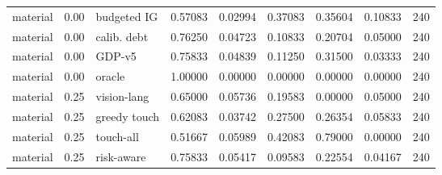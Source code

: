 \documentclass{article}
\begin{document}
\begin{center}
\begin{longtable}{lllllllll}
material & 0.00 & budgeted IG & 0.57083 & 0.02994 & 0.37083 & 0.35604 & 0.10833 & 240 \\
material & 0.00 & calib. debt & 0.76250 & 0.04723 & 0.10833 & 0.20704 & 0.05000 & 240 \\
material & 0.00 & GDP-v5 & 0.75833 & 0.04839 & 0.11250 & 0.31500 & 0.03333 & 240 \\
material & 0.00 & oracle & 1.00000 & 0.00000 & 0.00000 & 0.00000 & 0.00000 & 240 \\
material & 0.25 & vision-lang & 0.65000 & 0.05736 & 0.19583 & 0.00000 & 0.05000 & 240 \\
material & 0.25 & greedy touch & 0.62083 & 0.03742 & 0.27500 & 0.26354 & 0.05833 & 240 \\
material & 0.25 & touch-all & 0.51667 & 0.05989 & 0.42083 & 0.79000 & 0.00000 & 240 \\
material & 0.25 & risk-aware & 0.75833 & 0.05417 & 0.09583 & 0.22554 & 0.04167 & 240 \\
\bottomrule
\end{longtable}
\renewcommand{\arraystretch}{1.0}
\end{center}
\end{document}
